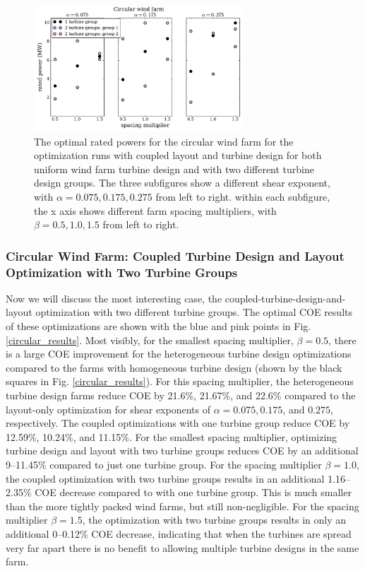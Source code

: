 \documentclass[WESD, manuscript]{copernicus}
\begin{document}
\begin{figure}[htbp]
  \centering
  \includegraphics[trim={0.5cm 0.3cm 0.3cm 0.75cm},clip,width=0.7\textwidth]{Figures/circlePowers.pdf}
  \caption{\label{circular_power} The optimal rated powers for the circular wind farm for the optimization runs with coupled layout and turbine design for both uniform wind farm turbine design and with two different turbine design groups. The three subfigures show a different shear exponent, with $\alpha=0.075,0.175,0.275$ from left to right. within each subfigure, the x axis shows different farm spacing multipliers, with $\beta=0.5,1.0,1.5$ from left to right.}
\end{figure}



\subsubsection{Circular Wind Farm: Coupled Turbine Design and Layout Optimization with Two Turbine Groups}

Now we will discuss the most interesting case, the coupled-turbine-design-and-layout optimization with two different turbine groups. The optimal COE results of these optimizations are shown with the blue and pink points in Fig. \ref{circular_results}. Most visibly, for the smallest spacing multiplier, $\beta=0.5$, there is a large COE improvement for the heterogeneous turbine design optimizations compared to the farms with homogeneous turbine design (shown by the black squares in Fig. \ref{circular_results}). For this spacing multiplier, the heterogeneous turbine design farms reduce COE by 21.6\%, 21.67\%, and 22.6\% compared to the layout-only optimization for shear exponents of $\alpha=0.075,0.175$, and $0.275$, respectively. The coupled optimizations with one turbine group reduce COE by 12.59\%, 10.24\%, and 11.15\%. For the smallest spacing multiplier, optimizing turbine design and layout with two turbine groups reduces COE by an additional 9--11.45\% compared to just one turbine group. For the spacing multiplier $\beta=1.0$, the coupled optimization with two turbine groups results in an additional 1.16--2.35\% COE decrease compared to with one turbine group. This is much smaller than the more tightly packed wind farms, but still non-negligible. For the spacing multiplier $\beta=1.5$, the optimization with two turbine groups results in only an additional 0--0.12\% COE decrease, indicating that when the turbines are spread very far apart there is no benefit to allowing multiple turbine designs in the same farm.
\end{document}
